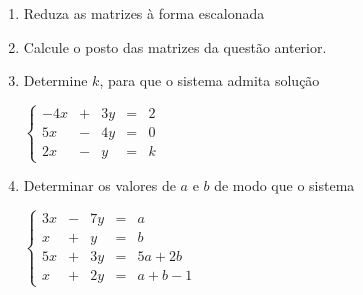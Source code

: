 \documentclass{article}
\begin{document}
\begin{enumerate}
\item Reduza as matrizes \`a forma escalonada


\item Calcule o posto das matrizes da quest\~ao anterior.

\item Determine $k$, para que o sistema admita solu\c{c}\~ao

$\left\{\begin{array}{ccccc}
	-4x & + & 3y & = & 2 \\
	5x & - & 4y & = & 0 \\
	2x & - & y & = & k
\end{array}\right.$

\item Determinar os valores de $a$ e $b$ de modo que o sistema

$\left\{\begin{array}{ccccl}
	3x & - & 7y & = & a \\
	x & + & y & = & b \\
	5x & + & 3y & = & 5a + 2b \\
	x & + & 2y & = & a + b -1
\end{array}\right.$


\end{enumerate}
\end{document}
